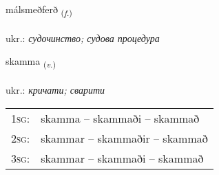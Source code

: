 \documentclass[frontgrid, backgrid]{flacards}\usepackage[]{graphicx}\usepackage[]{xcolor}
\begin{document}
\renewcommand{\flhead}{\vskip5pt \fboxsep=0pt {\small\bfseries\footnotesize Nafnorð | іменник}}
\renewcommand{\fcfoot}{\vskip5pt \fboxsep=0pt \hspace{2pt}{\small\bfseries\footnotesize 3K}}

\renewcommand{\blhead}{\vskip5pt {\small\bfseries\footnotesize Nafnorð | іменник }}
\renewcommand{\bcfoot}{\vskip5pt \hspace{2pt}{\small\bfseries\footnotesize 3K}}


{málsmeðferð \small{\textsubscript{(\textit{f.})}} \\[1ex] %
\textphonetic{[maulsmɛðfɛrð]} \\
ukr.: \emph{судочинство; судова процедура} \\  [2ex]
\renewcommand*{\arraystretch}{0.8}
}

\renewcommand{\flhead}{\vskip5pt \fboxsep=0pt {\small\bfseries\footnotesize Sagnorð | дієслово}}
\renewcommand{\fcfoot}{\vskip5pt \fboxsep=0pt \hspace{2pt}{\small\bfseries\footnotesize 3K}}

\renewcommand{\blhead}{\vskip5pt {\small\bfseries\footnotesize Sagnorð | дієслово }}
\renewcommand{\bcfoot}{\vskip5pt \hspace{2pt}{\small\bfseries\footnotesize 3K}}


{skamma \small{\textsubscript{(\textit{v.})}} \\[1ex] %
\textphonetic{[skama]} \\
ukr.: \emph{кричати; сварити} \\  [2ex]
\renewcommand*{\arraystretch}{0.8}
\begin{tabular}{p{1cm}l}
\textsc{1sg}: & skamma -- skammaði -- skammað \\ 
\textsc{2sg}: & skammar -- skammaðir -- skammað \\ 
\textsc{3sg}: & skammar -- skammaði -- skammað \\ 
\end{tabular}
}
\end{document}
